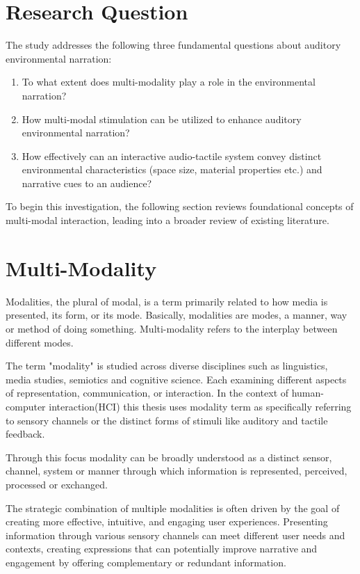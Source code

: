     \section{Research Question} 
    The study addresses the following three fundamental questions about auditory environmental narration:
    \begin{enumerate}
        \item To what extent does multi-modality play a role in the environmental narration?
        \item How multi-modal stimulation can be utilized to enhance auditory environmental narration?
        \item How effectively can an interactive audio-tactile system convey distinct environmental characteristics (space size, material properties etc.) and narrative cues to an audience?
    \end{enumerate}
    To begin this investigation, the following section reviews foundational concepts of multi-modal interaction, leading into a broader review of existing literature.
    \section{Multi-Modality} 
    Modalities, the plural of modal, is a term primarily related to how media is presented, its form, or its mode. Basically, modalities are modes, a manner, way or method of doing something. Multi-modality refers to the interplay between different modes\cite{Multimodal_Discourse}. 

    The term "modality" is studied across diverse disciplines such as linguistics, media studies, semiotics and cognitive science. Each examining different aspects of representation, communication, or interaction. In the context of human-computer interaction(HCI) this thesis uses modality term as specifically referring to sensory channels or the distinct forms of stimuli like auditory and tactile feedback.

    Through this focus modality can be broadly understood as a distinct sensor, channel, system or manner through which information is represented, perceived, processed or exchanged.

    The strategic combination of multiple modalities is often driven by the goal of creating more effective, intuitive, and engaging user experiences. Presenting information through various sensory channels can meet different user needs and contexts, creating expressions that can potentially improve narrative and engagement by offering complementary or redundant information.

